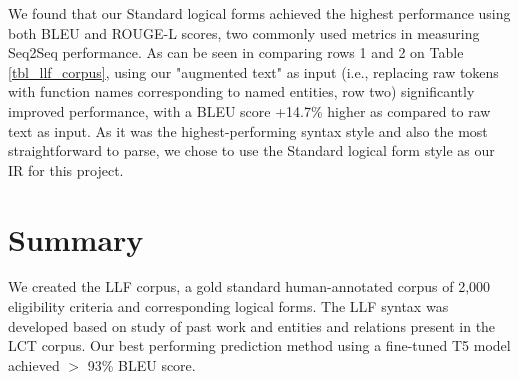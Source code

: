 \documentclass[../main.tex]{subfiles}
\begin{document}
We found that our Standard logical forms achieved the highest performance using both BLEU \cite{lin2004rouge} and ROUGE-L \cite{callison2006re} scores, two commonly used metrics in measuring Seq2Seq performance. As can be seen in comparing rows 1 and 2 on Table \ref{tbl_llf_corpus}, using our "augmented text" as input (i.e., replacing raw tokens with function names corresponding to named entities, row two) significantly improved performance, with a BLEU score +14.7\% higher as compared to raw text as input. As it was the highest-performing syntax style and also the most straightforward to parse, we chose to use the Standard logical form style as our IR for this project.

\section{Summary}
We created the LLF corpus, a gold standard human-annotated corpus of 2,000 eligibility criteria and corresponding logical forms. The LLF syntax was developed based on study of past work and entities and relations present in the LCT corpus. Our best performing prediction method using a fine-tuned T5 model achieved $>$ 93\% BLEU score.
\end{document}
